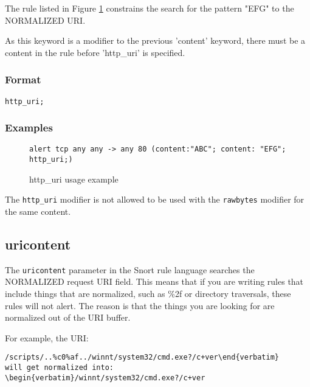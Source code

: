 \documentclass[english]{report}
\newenvironment{note}{
\samepage
    \vspace{10pt}{\textsf{
        {\hspace{7pt}\Huge{$\triangle$\hspace{-12.5pt}{\Large{$^!$}}}}\hspace{5pt}
        {\Large{NOTE}}
    }
    }
   \begin{center}
    \par\vspace{-17pt}

    \begin{lrbox}{\savepar}
    \begin{minipage}[r]{6in}
}
{
    \end{minipage}
    \end{lrbox}
    \fbox{
        \usebox{
            \savepar
	}
    }
    \par\vskip10pt
    \end{center}
}
\newenvironment{note}{
        \begin{rawhtml}
        <p><table border="1"><tr><td><b>
        Note:&nbsp;&nbsp;</b>
        \end{rawhtml}
}{
        \begin{rawhtml}
        </b></td></tr></table></p>
        \end{rawhtml}
}
\begin{document}
The rule listed in Figure \ref{fig:HttpUri} constrains the
search for the pattern "EFG" to the NORMALIZED URI.

As this keyword is a modifier to the previous 'content' keyword, there must be
a content in the rule before 'http\_uri' is specified.

\subsubsection{Format}

\begin{verbatim}
http_uri;
\end{verbatim}

\subsubsection{Examples}

\begin{figure}[!hbpt]
\begin{verbatim}
alert tcp any any -> any 80 (content:"ABC"; content: "EFG"; http_uri;)
\end{verbatim}
\caption{http\_uri usage example \label{fig:HttpUri}}
\end{figure}

\begin{note}
The \texttt{http\_uri} modifier is not allowed to be used with
the \texttt{rawbytes} modifier for the same content.
\end{note}

\subsection{uricontent\label{sub:UriContent}}

The \texttt{uricontent} parameter in the Snort rule language searches the
NORMALIZED request \textsc{URI} field.  This means that if you are writing
rules that include things that are normalized, such as \%2f or directory
traversals, these rules will not alert.  The reason is that the things you
are looking for are normalized out of the URI buffer.  

For example, the URI: 
\begin{verbatim}/scripts/..%c0%af../winnt/system32/cmd.exe?/c+ver\end{verbatim}
will get normalized into:
\begin{verbatim}/winnt/system32/cmd.exe?/c+ver\end{verbatim}
\end{document}
